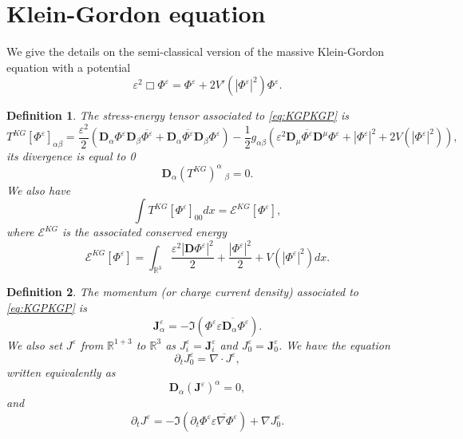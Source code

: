 \documentclass[a4paper, 15pt]{article}
\numberwithin{equation}{section}
\newtheorem{defi}{Definition}[section]
\begin{document}
\section{Klein-Gordon equation}
\label{section:KGPsec}
We give the details on the semi-classical version of the massive Klein-Gordon equation with a potential
\begin{equation}
\label{eq:KGPKGP}	\varepsilon^2\Box\Phi^\varepsilon=\Phi^\varepsilon+2V'(|\Phi^\varepsilon|^2)\Phi^\varepsilon.
\end{equation}
\begin{defi}
\label{defi:energytensorKGP}
The stress-energy tensor associated to \eqref{eq:KGPKGP} is 
\begin{equation}
\label{eq:stressenergyKGP}
    T^{KG}[\Phi^\varepsilon]_{\alpha\beta}=\frac{\varepsilon^2}{2}(\textbf{D}_\alpha\Phi^\varepsilon\textbf{D}_\beta\overline{\Phi^\varepsilon}+\textbf{D}_\alpha\overline{\Phi^\varepsilon}\textbf{D}_\beta\Phi^\varepsilon)-\frac{1}{2}g_{\alpha\beta}(\varepsilon^2\textbf{D}_\mu\overline{\Phi^\varepsilon}\textbf{D}^\mu\Phi^\varepsilon+|\Phi^\varepsilon|^2+2V(|\Phi^\varepsilon|^2)),
\end{equation}
its divergence is equal to 0 
\begin{equation}
\label{eq:divstressenergyKGP}
    \textbf{D}_\alpha (T^{KG})^{\alpha}~_\beta=0.
\end{equation}
We also have
\begin{equation}
\label{eq:EstressenergyKGP}
   \int{T^{KG}[\Phi^\varepsilon]_{00}dx}=\mathcal{E}^{KG}[\Phi^\varepsilon],
\end{equation}
where $\mathcal{E}^{KG}$ is the associated conserved energy
\begin{equation}
\label{eq:EenergyKGP}	
	\mathcal{E}^{KG}[\Phi^\varepsilon]=\int_{\mathbb{R}^3}{\frac{\varepsilon^2|\textbf{D}\Phi^\varepsilon|^2}{2}+\frac{|\Phi^\varepsilon|^2}{2}+V(|\Phi^\varepsilon|^2)dx}.
\end{equation}
\end{defi}
\begin{defi}
\label{defi:momentumKGP}
    The momentum (or charge current density) associated to \eqref{eq:KGPKGP} is
\begin{equation}
\label{eq:momentumequationKGP}
\textbf{J}^\varepsilon_\alpha=-\Im(\Phi^\varepsilon\overline{\varepsilon \textbf{D}_\alpha\Phi^\varepsilon}).
\end{equation}
We also set $J^\varepsilon$ from $\mathbb{R}^{1+3}$ to $\mathbb{R}^{3}$ as  $J_i^\varepsilon=\textbf{J}^\varepsilon_i$ and $J_0^\varepsilon=\textbf{J}^\varepsilon_0$. We have the equation 
\begin{equation}
\label{eq:momentumJ0KGP}
\partial_tJ_0^\varepsilon=\nabla\cdot J^\varepsilon,
\end{equation}
written equivalently as 
\begin{equation}
\label{eq:momentumbisKGP}
\textbf{D}_\alpha (\textbf{J}^\varepsilon)^\alpha=0,
\end{equation}
and
\begin{equation}
\label{eq:currentJKGP}
\partial_tJ^\varepsilon= -\Im(\partial_t\Phi^\varepsilon\overline{\varepsilon\nabla\Phi^\varepsilon})+\nabla J_0^\varepsilon.
\end{equation}
\end{defi}
\end{document}
